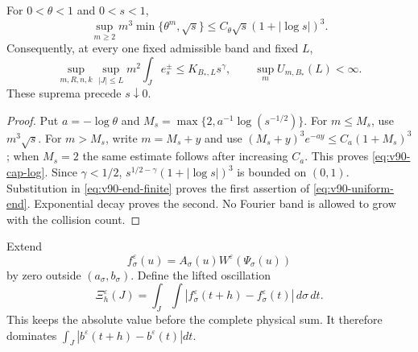 \begin{lemma}
\label{lem:v90-remainder-envelope}
For $0<\theta<1$ and $0<s<1$,
\begin{equation}\label{eq:v90-cap-log}
 \sup_{m\ge2}m^3\min\{\theta^m,\sqrt s\}
          \le C_\theta\sqrt s(1+|\log s|)^3.
\end{equation}
Consequently, at every one fixed admissible band and fixed $L$,
\begin{equation}\label{eq:v90-uniform-end}
 \sup_{m,R,n,k}\sup_{|J|\le L}m^2\int_J e_s^\pm
                \le K_{B_*,L}s^\gamma,\qquad
 \sup_m U_{m,B_*}(L)<\infty.
\end{equation}
These suprema precede $s\downarrow0$.
\end{lemma}
\begin{proof}
Put $a=-\log\theta$ and $M_s=\max\{2,a^{-1}\log(s^{-1/2})\}$.
For $m\le M_s$, use $m^3\sqrt s$. For $m>M_s$, write
$m=M_s+y$ and use
$(M_s+y)^3e^{-ay}\le C_a(1+M_s)^3$; when $M_s=2$ the
same estimate follows after increasing $C_a$. This proves
\eqref{eq:v90-cap-log}. Since $\gamma<1/2$,
$s^{1/2-\gamma}(1+|\log s|)^3$ is bounded on $(0,1)$.
Substitution in \eqref{eq:v90-end-finite} proves the first assertion
of \eqref{eq:v90-uniform-end}. Exponential decay proves the second.
No Fourier band is allowed to grow with the collision count.
\end{proof}

Extend
\[
 f_\sigma^\varepsilon(u)=A_\sigma(u)W^\varepsilon(\Psi_\sigma(u))
\]
by zero outside $(a_\sigma,b_\sigma)$. Define the lifted oscillation
\begin{equation}\label{eq:v90-lifted-oscillation}
 \Xi_h^\varepsilon(J)=\int_J\int
    |f_\sigma^\varepsilon(t+h)-f_\sigma^\varepsilon(t)|\,d\sigma\,dt.
\end{equation}
This keeps the absolute value before the complete physical sum.
It therefore dominates $\int_J|b^\varepsilon(t+h)-b^\varepsilon(t)|dt$.

